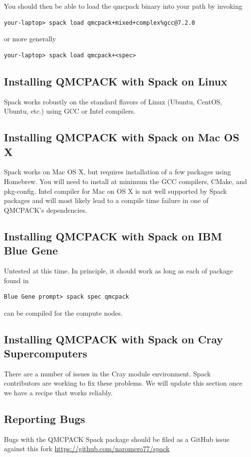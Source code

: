 You should then be able to load the qmcpack binary into your path by
invoking
\verbatimfont{\footnotesize}
\begin{verbatim}
your-laptop> spack load qmcpack+mixed+complex%gcc@7.2.0
\end{verbatim}
or more generally
\verbatimfont{\footnotesize}
\begin{verbatim}
your-laptop> spack load qmcpack+<spec>
\end{verbatim}

\subsection{Installing QMCPACK with Spack on Linux}
Spack works robustly on the standard flavors of Linux (Ubuntu, CentOS,
Ubuntu, etc.) using GCC or Intel compilers.

\subsection{Installing QMCPACK with Spack on Mac OS X}
Spack works on Mac OS X, but requires installation of a few packages
using Homebrew. You will need to install at minimum the GCC compilers,
CMake, and pkg-config. Intel compiler for Mac on OS X is not well
supported by Spack packages and will most likely lead to a compile
time failure in one of QMCPACK's dependencies.

\subsection{Installing QMCPACK with Spack on IBM Blue Gene}
Untested at this time. In principle, it should work as long as each of
package found in
\verbatimfont{\footnotesize}
\begin{verbatim}
Blue Gene prompt> spack spec qmcpack
\end{verbatim}
can be compiled for the compute nodes.

\subsection{Installing QMCPACK with Spack on Cray Supercomputers}
There are a number of issues in the Cray module environment. Spack
contributors are working to fix these problems. We will update this
section once we have a recipe that works reliably.

\subsection{Reporting Bugs}
Bugs with the QMCPACK Spack package should be filed as a GitHub issue
against this fork \url{https://github.com/naromero77/spack}

